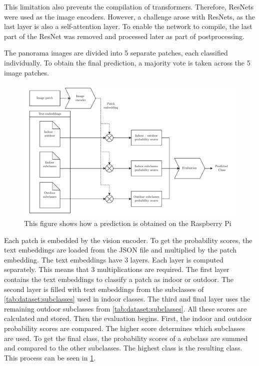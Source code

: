 This limitation also prevents the compilation of transformers.  
Therefore, ResNets were used as the image encoders.  
However, a challenge arose with ResNets, as the last layer is also a self-attention layer.  
To enable the network to compile, the last part of the ResNet was removed and processed later as part of postprocessing.  

The panorama images are divided into 5 separate patches, each classified individually.  
To obtain the final prediction, a majority vote is taken across the 5 image patches.

\begin{figure}[!h]
    \centering
    \includegraphics[width=\textwidth]{Images/SystemOverview/Evalution.pdf}
    \caption{This figure shows how a prediction is obtained on the Raspberry Pi}
    \label{fig:overview:evaluation}
\end{figure}

Each patch is embedded by the vision encoder.
To get the probability scores, the text embeddings are loaded from the JSON file and multiplied by the patch embedding.
The text embeddings have 3 layers.
Each layer is computed separately.
This means that 3 multiplications are required.
The first layer contains the text embeddings to classify a patch as indoor or outdoor.
The second layer is filled with text embeddings from the subclasses of \cref{tab:dataset:subclasses} used in indoor classes.
The third and final layer uses the remaining outdoor subclasses from \cref{tab:dataset:subclasses}.
All these scores are calculated and stored.
Then the evaluation begins.
First, the indoor and outdoor probability scores are compared.
The higher score determines which subclasses are used.
To get the final class, the probability scores of a subclass are summed and compared to the other subclasses.
The highest class is the resulting class.
This process can be seen in \cref{fig:overview:evaluation}.

